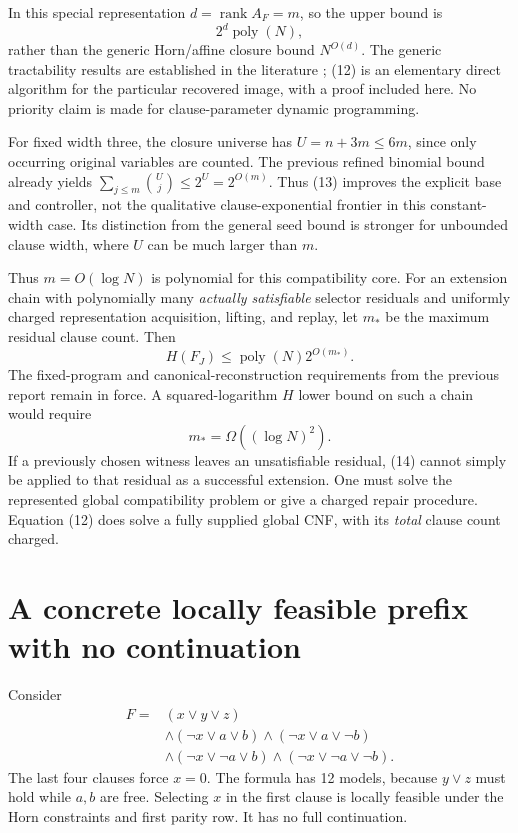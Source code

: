 \documentclass[11pt]{article}
\newcommand{\poly}{\operatorname{poly}}
\begin{document}
In this special representation $d=\operatorname{rank}A_F=m$, so the
upper bound is
\[
 2^d\poly(N),
 \tag{13}
\]
rather than the generic Horn/affine closure bound $N^{O(d)}$.
The generic tractability results are established in the literature
\cite{brakensiek2019}; (12) is an elementary direct algorithm for the
particular recovered image, with a proof included here.
No priority claim is made for clause-parameter dynamic programming.

For fixed width three, the closure universe has
$U=n+3m\le6m$, since only occurring original variables are counted.
The previous refined binomial bound already yields
$\sum_{j\le m}\binom Uj\le2^U=2^{O(m)}$.
Thus (13) improves the explicit base and controller, not the qualitative
clause-exponential frontier in this constant-width case.
Its distinction from the general seed bound is stronger for unbounded
clause width, where $U$ can be much larger than $m$.

Thus $m=O(\log N)$ is polynomial for this compatibility core.
For an extension chain with polynomially many \emph{actually satisfiable}
selector residuals and uniformly charged representation acquisition,
lifting, and replay, let $m_*$ be the maximum residual clause count.
Then
\[
 H(F_J)\le \poly(N)2^{O(m_*)}.
 \tag{14}
\]
The fixed-program and canonical-reconstruction requirements from the
previous report remain in force.
A squared-logarithm $H$ lower bound on such a chain would require
\[
 m_*=\Omega((\log N)^2).
 \tag{15}
\]
If a previously chosen witness leaves an unsatisfiable residual,
(14) cannot simply be applied to that residual as a successful
extension. One must solve the represented global compatibility problem
or give a charged repair procedure. Equation (12) does solve a fully
supplied global CNF, with its \emph{total} clause count charged.

\section{A concrete locally feasible prefix with no continuation}
Consider
\[
\begin{aligned}
 F={}&(x\vee y\vee z)\\
 &\wedge(\neg x\vee a\vee b)
 \wedge(\neg x\vee a\vee\neg b)\\
 &\wedge(\neg x\vee\neg a\vee b)
 \wedge(\neg x\vee\neg a\vee\neg b).
\end{aligned}
 \tag{16}
\]
The last four clauses force $x=0$. The formula has 12 models, because
$y\vee z$ must hold while $a,b$ are free.
Selecting $x$ in the first clause is locally feasible under the Horn
constraints and first parity row. It has no full continuation.
\end{document}
